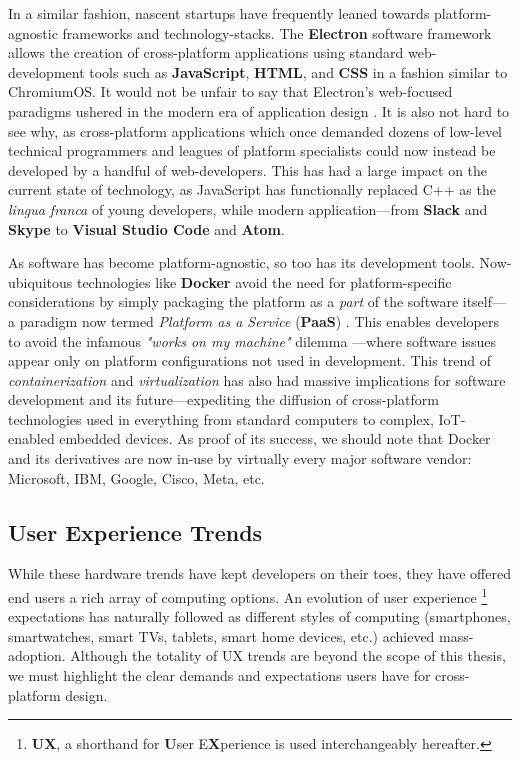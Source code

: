 \documentclass{report}
\newcommand{\tech}[1]{\textbf{#1}}
\begin{document}
In a similar fashion, nascent startups have frequently leaned towards platform-agnostic frameworks and technology-stacks. The \tech{Electron} software framework allows the creation of cross-platform applications using standard web-development tools such as \tech{JavaScript}, \tech{HTML}, and \tech{CSS} in a fashion similar to ChromiumOS. It would not be unfair to say that Electron's web-focused paradigms ushered in the modern era of application design \cite{Alexander_2024}. It is also not hard to see why, as cross-platform applications which once demanded dozens of low-level technical programmers and leagues of platform specialists could now instead be developed by a handful of web-developers. This has had a large impact on the current state of technology, as JavaScript has functionally replaced C++ as the \emph{lingua franca} of young developers, while modern application---from \tech{Slack} and \tech{Skype} to \tech{Visual Studio Code} and \tech{Atom}.  

As software has become platform-agnostic, so too has its development tools. Now-ubiquitous technologies like \tech{Docker} avoid the need for platform-specific considerations by simply packaging the platform as a \emph{ part} of the software itself---a paradigm now termed \emph{Platform as a Service} (\tech{PaaS}) \cite{kolb2019portability}. This enables developers to avoid the infamous \emph{"works on my machine"} dilemma \cite{Yadav_2021}---where software issues appear only on platform configurations not used in development. This trend of \emph{containerization} and \emph{virtualization} has also had massive implications for software development and its future---expediting the diffusion of cross-platform technologies used in everything from standard computers to complex, IoT-enabled embedded devices. As proof of its success, we should note that Docker and its derivatives are now in-use by virtually every major software vendor: Microsoft, IBM, Google, Cisco, Meta, etc.

\subsection{User Experience Trends}
While these hardware trends have kept developers on their toes, they have offered end users a rich array of computing options. An evolution of user experience \footnote{\textbf{UX}, a shorthand for \textbf{U}ser E\textbf{X}perience is used interchangeably hereafter.} expectations has naturally followed as different styles of computing (smartphones, smartwatches, smart TVs, tablets, smart home devices, etc.) achieved mass-adoption. Although the totality of UX trends are beyond the scope of this thesis, we must highlight the clear demands and expectations users have for cross-platform design. 
\end{document}
